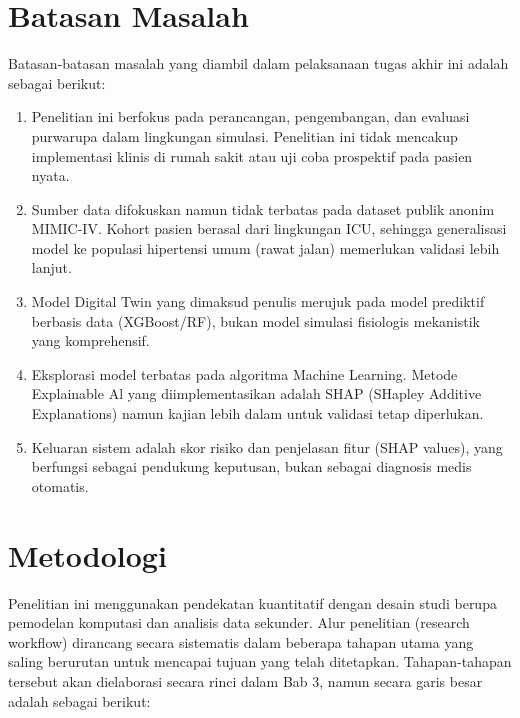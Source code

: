 \section{Batasan Masalah}
Batasan-batasan masalah yang diambil dalam pelaksanaan tugas akhir ini adalah sebagai berikut:
\begin{enumerate}
\item Penelitian ini berfokus pada perancangan, pengembangan, dan evaluasi purwarupa dalam lingkungan simulasi. Penelitian ini tidak mencakup implementasi klinis di rumah sakit atau uji coba prospektif pada pasien nyata.
\item Sumber data difokuskan namun tidak terbatas pada dataset publik anonim MIMIC-IV. Kohort pasien berasal dari lingkungan ICU, sehingga generalisasi model ke populasi hipertensi umum (rawat jalan) memerlukan validasi lebih lanjut.
\item Model Digital Twin yang dimaksud penulis merujuk pada model prediktif berbasis data (XGBoost/RF), bukan model simulasi fisiologis mekanistik yang komprehensif.
\item Eksplorasi model terbatas pada algoritma Machine Learning. Metode Explainable Al yang diimplementasikan adalah SHAP (SHapley Additive Explanations) namun kajian lebih dalam untuk validasi tetap diperlukan.
\item Keluaran sistem adalah skor risiko dan penjelasan fitur (SHAP values), yang berfungsi sebagai pendukung keputusan, bukan sebagai diagnosis medis otomatis.
\end{enumerate}

\section{Metodologi}
Penelitian ini menggunakan pendekatan kuantitatif dengan desain studi berupa pemodelan komputasi dan analisis data sekunder. Alur penelitian (research workflow) dirancang secara sistematis dalam beberapa tahapan utama yang saling berurutan untuk mencapai tujuan yang telah ditetapkan. Tahapan-tahapan tersebut akan dielaborasi secara rinci dalam Bab 3, namun secara garis besar adalah sebagai berikut:

